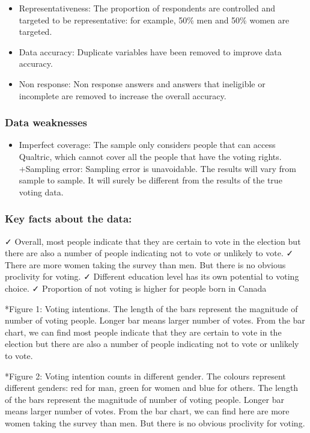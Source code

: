 \documentclass[
]{article}
\providecommand{\tightlist}{%
  \setlength{\itemsep}{0pt}\setlength{\parskip}{0pt}}
\begin{document}
\begin{itemize}
\tightlist
\item
  Representativeness: The proportion of respondents are controlled and
  targeted to be representative: for example, 50\% men and 50\% women
  are targeted.
\item
  Data accuracy: Duplicate variables have been removed to improve data
  accuracy.
\item
  Non response: Non response answers and answers that ineligible or
  incomplete are removed to increase the overall accuracy.
\end{itemize}

\hypertarget{data-weaknesses}{%
\subsubsection{Data weaknesses}\label{data-weaknesses}}

\begin{itemize}
\tightlist
\item
  Imperfect coverage: The sample only considers people that can access
  Qualtric, which cannot cover all the people that have the voting
  rights. +Sampling error: Sampling error is unavoidable. The results
  will vary from sample to sample. It will surely be different from the
  results of the true voting data.
\end{itemize}

\hypertarget{key-facts-about-the-data}{%
\subsubsection{Key facts about the
data:}\label{key-facts-about-the-data}}

✓ Overall, most people indicate that they are certain to vote in the
election but there are also a number of people indicating not to vote or
unlikely to vote. ✓ There are more women taking the survey than men. But
there is no obvious proclivity for voting. ✓ Different education level
has its own potential to voting choice. ✓ Proportion of not voting is
higher for people born in Canada

*Figure 1: Voting intentions. The length of the bars represent the
magnitude of number of voting people. Longer bar means larger number of
votes. From the bar chart, we can find most people indicate that they
are certain to vote in the election but there are also a number of
people indicating not to vote or unlikely to vote.

*Figure 2: Voting intention counts in different gender. The colours
represent different genders: red for man, green for women and blue for
others. The length of the bars represent the magnitude of number of
voting people. Longer bar means larger number of votes. From the bar
chart, we can find here are more women taking the survey than men. But
there is no obvious proclivity for voting.
\end{document}
